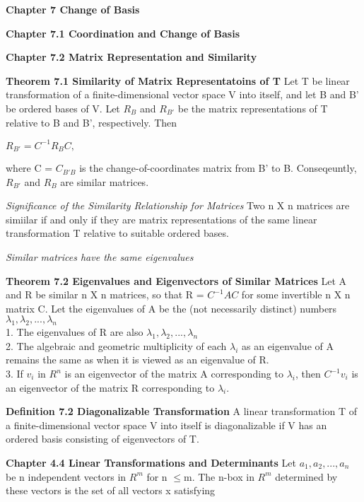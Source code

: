 \documentclass{article}
\begin{document}
\textbf {Chapter 7 Change of Basis}

\textbf {Chapter 7.1 Coordination and Change of Basis}

\textbf {Chapter 7.2 Matrix Representation and Similarity}

\textbf {Theorem 7.1 Similarity of Matrix Representatoins of T} Let T be linear transformation of a finite-dimensional vector space V into itself, and let B and B' be ordered bases of V. Let $R_B$ and $R_{B'}$ be the matrix representations of T relative to B and B', respectively. Then 

\begin{center}
$R_{B'} = C^{-1}R_BC,$

\end{center}

where C = $C_{B'B}$ is the change-of-coordinates matrix from B' to B. Conseqeuntly, $R_{B'}$ and $R_B$ are similar matrices.

\textit {Significance of the Similarity Relationship for Matrices} Two n X n matrices are simiilar if and only if they are matrix representations of the same linear transformation T relative to suitable ordered bases.

\textit {Similar matrices have the same eigenvalues}

\textbf {Theorem 7.2 Eigenvalues and Eigenvectors of Similar Matrices } Let A and R be similar n X n matrices, so that R = $C^{-1}AC$ for some invertible n X n matrix C. Let the eigenvalues of A be the (not necessarily distinct) numbers $\lambda_1, \lambda_2 ,...,\lambda_{n}$ \\
1. The eigenvalues of R are also $\lambda_1, \lambda_2 
,..., \lambda_n$ \\
2. The algebraic and geometric multiplicity of each $\lambda_i$ as an eigenvalue of A remains the same as when it is viewed as an eigenvalue of R. \\
3. If $v_i$ in $R^n$ is an eigenvector of the matrix A corresponding to $\lambda_i$, then $C^{-1}v_i$ is an eigenvector of the matrix R corresponding to $\lambda_i$.

\textbf {Definition 7.2 Diagonalizable Transformation} A linear transformation T of a finite-dimensional vector space V into itself is diagonalizable if V has an ordered basis consisting of eigenvectors of T.

\textbf {Chapter 4.4 Linear Transformations and Determinants} Let $a_1, a_2, ... , a_n$ be n independent vectors in $R^m$ for n $\leq$m. The n-box in $R^m$ determined by these vectors is the set of all vectors x satisfying 
\end{document}
